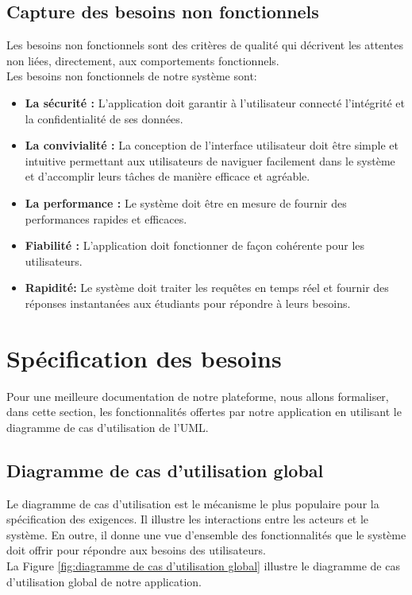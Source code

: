 \subsection{Capture des besoins non fonctionnels}
Les besoins non fonctionnels sont des critères de qualité qui décrivent les attentes non liées, directement, aux  comportements fonctionnels.\\
Les besoins non fonctionnels de notre système sont:
\begin{itemize}[itemsep=1pt, parsep=1pt]
    \item \textbf{La sécurité : }L'application doit garantir à l'utilisateur connecté l'intégrité et la confidentialité de ses données.
    \item \textbf{La convivialité : }La conception de l’interface utilisateur doit être simple et intuitive permettant aux utilisateurs de naviguer facilement dans le système et d’accomplir leurs tâches de manière efficace et agréable.
    \item \textbf{La performance : } Le système doit être en mesure de fournir des performances rapides et efficaces.
    \item \textbf{Fiabilité : } L’application doit fonctionner de façon cohérente pour les utilisateurs.
    \item \textbf{Rapidité: } Le système doit traiter les requêtes en temps réel et fournir des réponses instantanées aux étudiants pour répondre à leurs besoins. 
\end{itemize}

\section{Spécification des besoins }
Pour une meilleure documentation de notre plateforme, nous allons formaliser, dans cette section, les fonctionnalités offertes par notre application en utilisant le diagramme de cas d'utilisation de l’UML.

\subsection{Diagramme de cas d’utilisation global}
Le diagramme de cas d'utilisation est le mécanisme le plus populaire pour la spécification des exigences. Il illustre les interactions entre les acteurs et le système. En outre, il donne une vue d'ensemble des fonctionnalités que le système doit offrir pour répondre aux besoins des utilisateurs.\\
La Figure \ref{fig:diagramme de cas d’utilisation global} illustre le diagramme de cas d’utilisation global de notre application.

